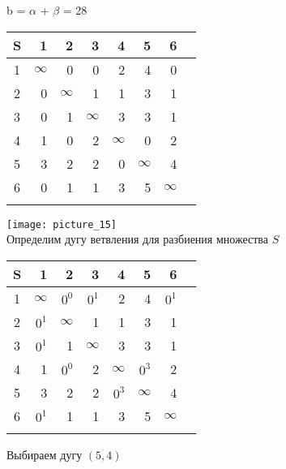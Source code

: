 \documentclass[12pt]{article}
\begin{document}
b = $\alpha$ + $\beta$ = 28

\begin{flushleft}
\begin{tabular}{c||rrrrrr||c}
S & 1 & 2 & 3 & 4 & 5 & 6 & \\
\hline
\hline
1 & $\infty$ & 0 & 0 & 2 & 4 & 0 & \\
2 & 0 & $\infty$ & 1 & 1 & 3 & 1 & \\
3 & 0 & 1 & $\infty$ & 3 & 3 & 1 & \\
4 & 1 & 0 & 2 & $\infty$ & 0 & 2 & \\
5 & 3 & 2 & 2 & 0 & $\infty$ & 4 & \\
6 & 0 & 1 & 1 & 3 & 5 & $\infty$ & \\
\hline
\hline
 &  &  &  &  & & & \\
\end{tabular}
\end{flushleft}

\texttt{[image: picture\_15]}\\

Определим дугу ветвления для разбиения множества $S$

\begin{flushleft}
\begin{tabular}{c||rrrrrr||c}
S & 1 & 2 & 3 & 4 & 5 & 6 & \\
\hline
\hline
1 & $\infty$ & $0^0$ & $0^1$ & 2 & 4 & $0^1$ & \\
2 & $0^1$ & $\infty$ & 1 & 1 & 3 & 1 & \\
3 & $0^1$ & 1 & $\infty$ & 3 & 3 & 1 & \\
4 & 1 & $0^0$ & 2 & $\infty$ & $0^3$ & 2 & \\
5 & 3 & 2 & 2 & $0^3$ & $\infty$ & 4 & \\
    6 & $0^1$ & 1 & 1 & 3 & 5 & $\infty$ & \\
\hline
\hline
 &  &  &  &  & & & \\
\end{tabular}
\end{flushleft} 

Выбираем дугу $(5,4)$ 
\end{document}
